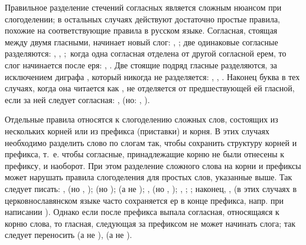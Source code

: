 \documentclass[12pt,a4paper,oneside]{extarticle}
\begin{document}
Правильное разделение стечений согласных является сложным нюансом при слогоделении; в остальных случаях действуют достаточно простые правила, похожие на соответствующие правила в русском языке. Согласная, стоящая между двумя гласными, начинает новый слог: , ; две одинаковые согласные разделяются: , , ; когда одна согласная отделена от другой согласной ерем, то слог начинается после еря: , . Две стоящие подряд гласные разделяются, за исключением диграфа , который никогда не разделяется: , , . Наконец буква  в тех случаях, когда она читается как , не отделяется от предшествующей ей гласной, если за ней следует согласная: ,  (но: , ).

Отдельные правила относятся к слогоделению сложных слов, состоящих из нескольких корней или из префикса (приставки) и корня. В этих случаях необходимо разделить слово по слогам так, чтобы сохранить структуру корней и префикса, т.~е. чтобы согласные, принадлежащие корню не были отнесены к префиксу, и наоборот. При этом разделение сложного слова на корни и префиксы может нарушать правила слогоделения для простых слов, указанные выше. Так следует писать: ,  (но , );  (но );  (а не ); ,  (но  , ); , ; ; наконец, ,  (в этих случаях в церковнославянском языке часто сохраняется ер в конце префикса, напр. при написании ). Однако если после префикса выпала согласная, относящаяся к корню слова, то гласная, следующая за префиксом не может начинать слога; так следует переносить  (а не ),  (а не ).
\end{document}

